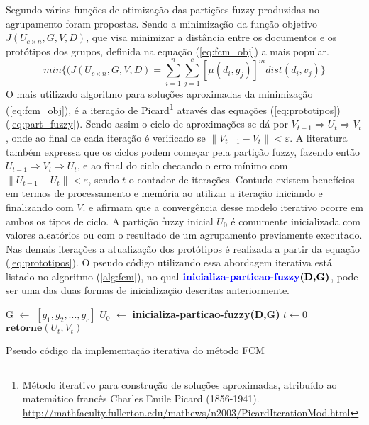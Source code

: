 Segundo  várias funções de otimização das partições fuzzy produzidas no agrupamento
foram propostas. Sendo a minimização da função objetivo $J(U_{c \times n},G,V,D)$, que visa
minimizar a distância entre os documentos e os protótipos dos grupos\cite{Nogueira2013}, definida na
equação (\ref{eq:fcm_obj}) a mais popular.  \begin{equation} min\{(J(U_{c \times n},G,V,D) =
\sum_{i=1}^n \sum_{j=1}^c [\mu(d_i, g_j)]^m dist(d_i, v_j)\} \label{eq:fcm_obj} \end{equation} O
mais utilizado algoritmo para soluções aproximadas da minimização (\ref{eq:fcm_obj}), é a iteração
de Picard\footnote{Método iterativo para construção de soluções aproximadas, atribuído ao matemático
francês Charles Emile Picard (1856-1941).
\url{http://mathfaculty.fullerton.edu/mathews/n2003/PicardIterationMod.html}}\cite{Pal2005} através
das equações (\ref{eq:prototipos})(\ref{eq:part_fuzzy}). Sendo assim  o ciclo de aproximações se dá
por $V_{t-1} \Rightarrow  U_t \Rightarrow  V_t$, onde ao final de cada iteração é verificado se
$\parallel V_{t-1} - V_t\parallel < \varepsilon$.  A literatura também expressa que os ciclos podem
começar pela partição fuzzy, fazendo então $U_{t-1} \Rightarrow  V_t \Rightarrow  U_t$, e ao final
do ciclo checando o erro mínimo com $\parallel U_{t-1} - U_t\parallel < \varepsilon$, sendo $t$ o
contador de iterações.  Contudo existem benefícios em termos de processamento e memória ao utilizar
a iteração iniciando e finalizando com $V$\cite{Pal2005}.  \cite{Bezdek1984} e \cite{Pal2005}
afirmam que a convergência desse modelo iterativo ocorre em ambos os tipos de ciclo.  A partição
fuzzy inicial $U_0$ é comumente inicializada com valores aleatórios\cite{Nogueira2013} ou com o
resultado de um agrupamento previamente executado\cite{Pal2005}\cite{Krishnapuram1993}. Nas demais
iterações a atualização dos protótipos é realizada a partir da equação (\ref{eq:prototipos}). O
pseudo código utilizando essa abordagem iterativa está listado no algoritmo (\ref{alg:fcm}), no qual
$\textbf{{\color{blue}inicializa-particao-fuzzy}(D,G)}$, pode ser uma das duas formas de
inicialização descritas anteriormente.

\begin{algorithm}[H] 
  \SetAlgoLined {} 
  G $\gets$ $[g_1,g_2,...,g_c]$\; 
  $U_0$ $\gets$ \textbf{{\color{blue}inicializa-particao-fuzzy}(D,G)}\; 
  $t \gets 0$\; 
  $\textbf{retorne} (U_t, V_t)$\; 
  \caption{Pseudo código da implementação iterativa do método FCM}
\label{alg:fcm} \end{algorithm}

